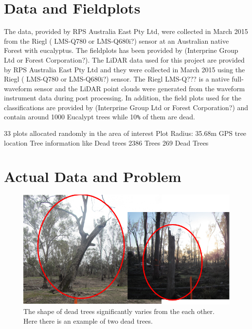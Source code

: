 \documentclass{subfiles}
\begin{document}

\section{Data and Fieldplots}

\par The data, provided by RPS Australia East Pty Ltd, were collected in March 2015 from the Riegl ( LMS-Q780 or LMS-Q680i?) sensor at an Australian native Forest with eucalyptus. The fieldplots has been provided by (Interprine Group Ltd or Forest Corporation?). 
The LiDAR data used for this project are provided by RPS Australia East Pty Ltd and they were collected in March 2015 using the Riegl ( LMS-Q780 or LMS-Q680i?) sensor. The Riegl LMS-Q??? is a native full-waveform sensor and the LiDAR point clouds were generated from the waveform instrument data during post processing. In addition, the field plots used for the classifications are provided by (Interprine Group Ltd or Forest Corporation?) and contain around 1000 Eucalypt trees while 10\verb|%| of them are dead. 

33 plots allocated randomly in the area of interest
Plot Radius: 35.68m 
GPS tree location
Tree information like Dead trees
2386 Trees 
269 Dead Trees


\section{Actual Data and Problem}

\begin{figure} [h!]
	\centering
	\includegraphics[width=\textwidth]{img/DeadTreesExamplePhotos}
	\caption{The shape of dead trees significantly varies from the each other. Here there is an example of two dead trees.}
	\label{fig:DeadTreesExamplePhotos}
\end{figure}
\end{document}
